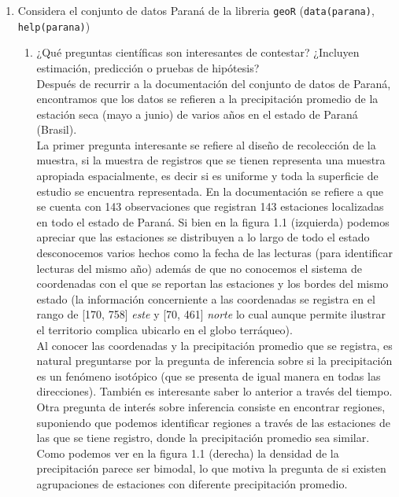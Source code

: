 \documentclass[paper=letter, fontsize=11pt]{scrartcl}
\numberwithin{equation}{section} %
\numberwithin{figure}{section} %
\numberwithin{table}{section} %
\begin{document}
\begin{enumerate}
\item Considera el conjunto de datos Paraná de la libreria \verb|geoR| (\verb|data(parana)|, \verb|help(parana)|)
  \begin{enumerate}
  \item ¿Qué preguntas científicas son interesantes de contestar? ¿Incluyen estimación, predicción o pruebas de hipótesis? \\
  
  Después de recurrir a la documentación del conjunto de datos de Paraná, encontramos que los datos se refieren a la precipitación promedio de la estación seca (mayo a junio) de varios años en el estado de Paraná (Brasil).\\

La primer pregunta interesante se refiere al diseño de recolección de la muestra, si la muestra de registros que se tienen representa una muestra apropiada espacialmente, es decir si es uniforme y toda la superficie de estudio se encuentra representada. En la documentación se refiere a que se cuenta con 143 observaciones que registran 143 estaciones localizadas en todo el estado de Paraná. Si bien en la figura 1.1 (izquierda) podemos apreciar que las estaciones se distribuyen a lo largo de todo el estado desconocemos varios hechos como la fecha de las lecturas (para identificar lecturas del mismo año) además de que no conocemos el sistema de coordenadas con el que se reportan las estaciones y los bordes del mismo estado (la información concerniente a las coordenadas se registra en el rango de [170, 758] \textit{este} y [70, 461] \textit{norte} lo cual aunque permite ilustrar el territorio complica ubicarlo en el globo terráqueo).\\

Al conocer las coordenadas y la precipitación promedio que se registra, es natural preguntarse por la pregunta de inferencia sobre si la precipitación es un fenómeno isotópico (que se presenta de igual manera en todas las direcciones). También es interesante saber lo anterior a través del tiempo. Otra pregunta de interés sobre inferencia consiste en encontrar regiones, suponiendo que podemos identificar regiones a través de las estaciones de las que se tiene registro, donde la precipitación promedio sea similar. Como podemos ver en la figura 1.1 (derecha) la densidad de la precipitación parece ser bimodal, lo que motiva la pregunta de si existen agrupaciones de estaciones con diferente precipitación promedio.\\


\end{enumerate}
\end{enumerate}
\end{document}
